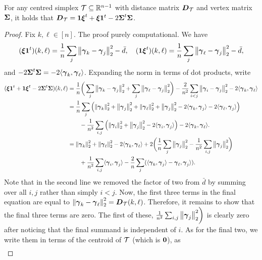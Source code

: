 \begin{lemma}
	\label{lem:distance_matrix}
	For any centred simplex $\mathcal{T}\subseteq\mathbb{R}^{n-1}$  with distance matrix $\vb*{D}_{\mathcal{T}}$ and vertex  matrix $\boldsymbol{\Sigma}$, it holds  that $\vb*{D}_{\mathcal{T}} = \vb{1}\vb*{\xi}^t + \vb*{\xi}\vb{1}^t - 2\boldsymbol{\Sigma}^t\boldsymbol{\Sigma}$.
\end{lemma}
\begin{proof}
	Fix  $k,\ell\in[n]$. The proof purely computational. We have 
	\begin{equation*}
	(\vb*{\xi}\vb{1}^t)(k,\ell) = \frac{1}{n}\sum_j\norm{\vb*{\gamma}_k-\vb*{\gamma}_j}_2^2 - \bar{d},\quad (\vb{1}\vb*{\xi}^t)(k,\ell) = \frac{1}{n}\sum_j\norm{\vb*{\gamma}_\ell-\vb*{\gamma}_j}_2^2 - \bar{d}, 
	\end{equation*}
	and  $-2\boldsymbol{\Sigma}^t\boldsymbol{\Sigma} = -2\langle \vb*{\gamma}_k,\vb*{\gamma}_\ell\rangle$. 
	Expanding the norm in terms of dot products, write
	\begin{align*}
	(\vb*{\xi}\vb{1}^t + \vb{1}\vb*{\xi}^t - 2\boldsymbol{\Sigma}^t\boldsymbol{\Sigma})(k,\ell) &= \frac{1}{n}\bigg(\sum_j \norm{\vb*{\gamma}_k-\vb*{\gamma}_j}_2^2 + \sum_j\norm{\vb*{\gamma}_\ell-\vb*{\gamma}_j}_2^2 \bigg) - \frac{2}{n^2}\sum_{i<j} \norm{\vb*{\gamma}_i-\vb*{\gamma}_j}_2^2 -2\langle\vb*{\gamma}_k,\vb*{\gamma}_\ell\rangle \\ 
	&=\frac{1}{n}\sum_j\left(\norm{\vb*{\gamma}_k}_2^2 + \norm{\vb*{\gamma}_j}_2^2+\norm{\vb*{\gamma}_\ell}_2^2 +\norm{\vb*{\gamma}_j}_2^2  -2\langle \vb*{\gamma}_k,\vb*{\gamma}_j\rangle -2\langle\vb*{\gamma}_\ell,\vb*{\gamma}_j\rangle\right) \\
	&\qquad -\frac{1}{n^2}\sum_{i,j}\left(\norm{\vb*{\gamma}_i}_2^2+\norm{\vb*{\gamma}_j}_2^2-2\langle\vb*{\gamma}_i,\vb*{\gamma}_j\rangle\right)  -2\langle \vb*{\gamma}_k,\vb*{\gamma}_\ell\rangle. \\
	&= \norm{\vb*{\gamma}_k}_2^2 + \norm{\vb*{\gamma}_\ell}_2^2 - 2\langle\vb*{\gamma}_k,\vb*{\gamma}_\ell\rangle + 2\bigg(\frac{1}{n}\sum_j\norm{\vb*{\gamma}_j}_2^2 - \frac{1}{n^2}\sum_{i,j}\norm{\vb*{\gamma}_j}_2^2\bigg)  \\
	&\qquad +\frac{1}{n^2}\sum_{i,j} \langle \vb*{\gamma}_i,\vb*{\gamma}_j\rangle - \frac{2}{n}\sum_j (\langle \vb*{\gamma}_k,\vb*{\gamma}_j\rangle -\vb*{\gamma}_\ell,\vb*{\gamma}_j\rangle).
	\end{align*} 
	Note that in the second  line we removed the factor of two from $\bar{d}$ by summing over all $i,j$ rather than simply $i<j$. 
	Now, the first three terms in the final equation are  equal to $\norm{\vb*{\gamma}_k-\vb*{\gamma}_\ell}_2^2=\vb*{D}_{\mathcal{T}}(k,\ell)$. Therefore,  it remains  to show  that the final  three terms are zero. The first  of  these, $\frac{1}{n^2}\sum_{i,j}\norm{\vb*{\gamma}_j}_2^2\bigg)$  is clearly   zero after noticing that the final summand is independent of $i$. As for the final two, we write them in terms of  the centroid of $\mathcal{T}$ (which is $\vb{0}$), as 
	\begin{align*}

\end{align*}
\end{proof}
